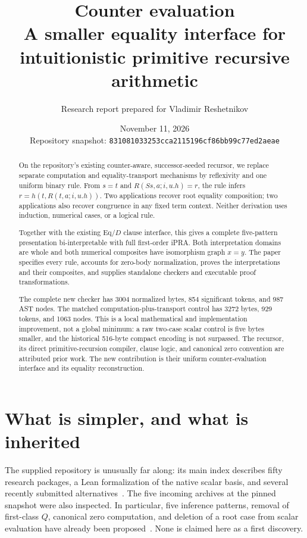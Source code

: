 \documentclass[11pt,letterpaper]{article}
\title{\textbf{Counter evaluation}\\[4pt]\large A smaller equality interface for intuitionistic primitive recursive arithmetic}
\author{Research report prepared for Vladimir Reshetnikov}
\date{November 11, 2026\\[4pt]\small Repository snapshot: \texttt{831081033253cca2115196cf86bb99c77ed2aeae}}
\theoremstyle{definition}
\begin{document}
\maketitle
\begin{abstract}
On the repository's existing counter-aware, successor-seeded recursor,
we replace separate computation and equality-transport mechanisms by
reflexivity and one uniform binary rule. From $s=t$ and
$R(Ss,a;i,u.h)=r$, the rule infers $r=h(t,R(t,a;i,u.h))$.
Two applications recover root equality composition; two applications
also recover congruence in any fixed term context. Neither derivation
uses induction, numerical cases, or a logical rule.

Together with the existing Eq/$D$ clause interface, this gives a complete
five-pattern presentation bi-interpretable with full first-order iPRA.
Both interpretation domains are whole and both numerical composites
have isomorphism graph $x=y$. The paper specifies every rule, accounts
for zero-body normalization, proves the interpretations and their
composites, and supplies standalone checkers and executable proof transformations.

The complete new checker has 3004 normalized bytes, 854 significant
tokens, and 987 AST nodes. The matched computation-plus-transport
control has 3272 bytes, 929 tokens, and 1063 nodes. This is a local
mathematical and implementation improvement, not a global minimum:
a raw two-case scalar control is five bytes smaller, and the historical
516-byte compact encoding is not surpassed. The recursor, its direct
primitive-recursion compiler, clause logic, and canonical zero convention
are attributed prior work. The new contribution is their uniform
counter-evaluation interface and its equality reconstruction.
\end{abstract}
\clearpage
\setcounter{tocdepth}{1}\tableofcontents
\clearpage

\section{What is simpler, and what is inherited}
\label{sec:comparison}

The supplied repository is unusually far along: its main index describes
fifty research packages, a Lean formalization of the native scalar basis,
and several recently submitted alternatives~\cite{index}.
The five incoming archives at the pinned snapshot were also inspected.
In particular, five inference patterns, removal of first-class $Q$,
canonical zero computation, and deletion of a root case from scalar
evaluation have already been proposed~\cite{clausal,raw,iteration}.
None is claimed here as a first discovery.
\end{document}

